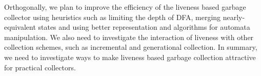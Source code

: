 \documentclass[9pt]{sigplanconf}
\begin{document}
  Orthogonally,  we plan  to improve  the efficiency  of the  liveness
  based garbage collector using heuristics  such as limiting the depth
  of  DFA,   merging  nearly-equivalent   states  and   using  better
  representation  and algorithms  for automata  manipulation. We  also
  need  to   investigate  the  interaction  of   liveness  with  other
  collection schemes, such as incremental and generational collection.
  In  summary, we  need to  investigate  ways to  make liveness  based
  garbage collection attractive for practical collectors.  

{}

\end{document}
